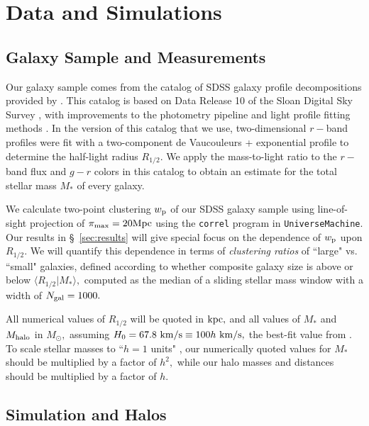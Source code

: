 \documentclass[usenatbib,usegraphicx,letterpaper]{mn2e}
\newcommand{\rhalf}{R_{1/2}}
\newcommand{\mstar}{M_{\ast}}
\newcommand{\mhalo}{M_{\rm halo}}
\newcommand{\wproj}{w_{\rm p}}
\newcommand{\kpc}{{\rm kpc}}
\newcommand{\mpc}{{\rm Mpc}}
\newcommand{\msun}{M_\odot}
\newcommand{\kms}{{\rm km/s}}
\begin{document}
\section{Data and Simulations}
\label{sec:data}

\subsection{Galaxy Sample and Measurements}
\label{subsec:galaxydata}


Our galaxy sample comes from the catalog of SDSS galaxy profile decompositions provided by \citet{meert_etal15}. This catalog is based on Data Release 10 of the Sloan Digital Sky Survey \citep[SDSS,][]{ahn_etal14}, with improvements to the photometry pipeline and light profile fitting methods \citep{vikram_etal10,bernardi_etal13,bernardi_etal14,meert_etal13}. In the version of this catalog that we use, two-dimensional $r-$band profiles were fit with a two-component de Vaucouleurs + exponential profile to determine the half-light radius $\rhalf.$ We apply the \citet{bell_etal03} mass-to-light ratio to the $r-$band flux and $g-r$ colors in this catalog to obtain an estimate for the total stellar mass $\mstar$ of every galaxy.

We calculate two-point clustering $\wproj$ of our SDSS galaxy sample using line-of-sight projection of $\pi_{\rm max}=20\mpc$ using the {\tt correl} program in {\tt UniverseMachine}. Our results in \S~\ref{sec:results} will give special focus on the dependence of $\wproj$ upon $\rhalf.$ We will quantify this dependence in terms of {\em clustering ratios} of ``large" vs. ``small" galaxies, defined according to whether composite galaxy size is above or below $\langle\rhalf\vert\mstar\rangle,$ computed as the median of a sliding stellar mass window with a width of $N_{\rm gal}=1000.$

All numerical values of $\rhalf$ will be quoted in $\kpc,$ and all values of $\mstar$ and $\mhalo$ in $\msun,$ assuming $H_0=67.8~\kms\equiv100h~\kms,$ the best-fit value from \citet{planck15}. To scale stellar masses to ``$h=1$ units" \citep{croton13}, our numerically quoted values for $\mstar$ should be multiplied by a factor of $h^2,$ while our halo masses and distances should be multiplied by a factor of $h.$

\subsection{Simulation and Halos}
\label{subsec:sim}
\end{document}
